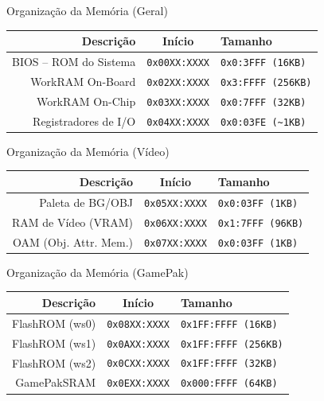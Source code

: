 \documentclass{beamer}
\begin{document}
\begin{darkframes}
    \begin{frame}{Organização da Memória (Geral)}
        \begin{center}
            \begin{tabular}{|r|c|l|}
                \hline
                Descrição              & Início               & Tamanho \\\hline
                BIOS -- ROM do Sistema & \texttt{0x00XX:XXXX} & \texttt{0x0:3FFF (16KB)} \\\hline
                WorkRAM On-Board       & \texttt{0x02XX:XXXX} & \texttt{0x3:FFFF (256KB)} \\\hline
                WorkRAM On-Chip        & \texttt{0x03XX:XXXX} & \texttt{0x0:7FFF (32KB)} \\\hline
                Registradores de I/O   & \texttt{0x04XX:XXXX} & \texttt{0x0:03FE (\textasciitilde1KB)} \\\hline
            \end{tabular}
        \end{center}
    \end{frame}

    \begin{frame}{Organização da Memória (Vídeo)}
        \begin{center}
            \begin{tabular}{|r|c|l|}
                \hline
                Descrição             & Início               & Tamanho \\\hline
                Paleta de BG/OBJ      & \texttt{0x05XX:XXXX} & \texttt{0x0:03FF (1KB)} \\\hline
                RAM de Vídeo (VRAM)   & \texttt{0x06XX:XXXX} & \texttt{0x1:7FFF (96KB)} \\\hline
                OAM (Obj. Attr. Mem.) & \texttt{0x07XX:XXXX} & \texttt{0x0:03FF (1KB)} \\\hline
            \end{tabular}
        \end{center}
    \end{frame}

    \begin{frame}{Organização da Memória (GamePak)}
        \begin{center}
            \begin{tabular}{|r|c|l|}
                \hline
                Descrição      & Início               & Tamanho \\\hline
                FlashROM (ws0) & \texttt{0x08XX:XXXX} & \texttt{0x1FF:FFFF (16KB)} \\\hline
                FlashROM (ws1) & \texttt{0x0AXX:XXXX} & \texttt{0x1FF:FFFF (256KB)} \\\hline
                FlashROM (ws2) & \texttt{0x0CXX:XXXX} & \texttt{0x1FF:FFFF (32KB)} \\\hline
                GamePakSRAM    & \texttt{0x0EXX:XXXX} & \texttt{0x000:FFFF (64KB)} \\\hline
            \end{tabular}
        \end{center}
    \end{frame}


\end{darkframes}
\end{document}
